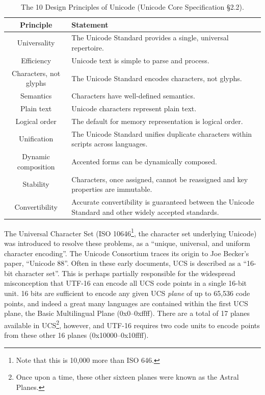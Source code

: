 \documentclass[letterpaper,10pt]{article}
\begin{document}
\begin{table}[!htb]
  \begin{center}
    \begin{tabular}{ |c|p{}| }
      \hline
      Principle & Statement \\
      \hline
      \hline
      Universality & The Unicode Standard provides a single, universal repertoire. \\
      \hline
      Efficiency & Unicode text is simple to parse and process. \\
      \hline
      Characters, not glyphs & The Unicode Standard encodes characters, not glyphs. \\
      \hline
      Semantics & Characters have well-defined semantics. \\
      \hline
      Plain text & Unicode characters represent plain text. \\
      \hline
      Logical order & The default for memory representation is logical order. \\
      \hline
      Unification & The Unicode Standard unifies duplicate characters within scripts across languages. \\
      \hline
      Dynamic composition & Accented forms can be dynamically composed. \\
      \hline
      Stability & Characters, once assigned, cannot be reassigned and key properties are immutable. \\
      \hline
      Convertibility & Accurate convertibility is guaranteed between the Unicode Standard and other widely accepted standards. \\
      \hline
    \end{tabular}
  \end{center}
  \caption[The ten Unicode design principles.]{The 10 Design Principles of Unicode (Unicode Core Specification §2.2\cite{unicode}).}
  \label{table:ucsdesign}
\end{table}
The Universal Character Set (ISO 10646\footnote{Note that this is 10,000 more than ISO 646.},
the character set underlying Unicode) was introduced to resolve these problems,
as a ``unique, universal, and uniform character encoding''\cite{unicodehistory}. The
Unicode Consortium traces its origin to Joe Becker's paper, ``Unicode 88''\cite{unicode88}.
Often in these early documents, UCS is described as a ``16-bit character set''.
This is perhaps partially responsible for the widespread misconception that UTF-16\cite{rfc2781}
can encode all UCS code points in a single 16-bit unit. 16 bits are sufficient
to encode any given UCS \textit{plane} of up to 65,536 code points, and indeed a great
many languages are contained within the first UCS plane, the Basic Multilingual
Plane (0x0--0xffff). There are a total of 17 planes available in
UCS\footnote{Once upon a time, these other sixteen planes were known as the
Astral Planes\cite{astralplanes}.}, however, and UTF-16 requires two code
units to encode points from these other 16 planes (0x10000--0x10ffff).
\end{document}
